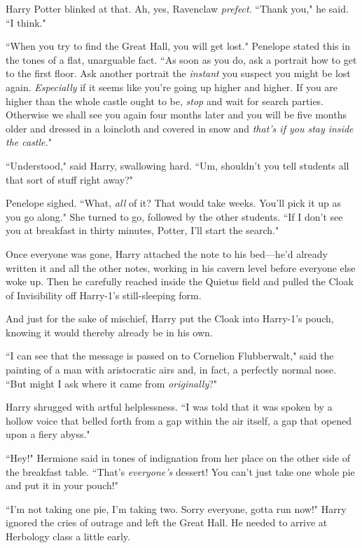 Harry Potter blinked at that. Ah, yes, Ravenclaw \emph{prefect}. ``Thank you," he said. ``I think."

``When you try to find the Great Hall, you will get lost." Penelope stated this in the tones of a flat, unarguable fact. ``As soon as you do, ask a portrait how to get to the first floor. Ask another portrait the \emph{instant} you suspect you might be lost again. \emph{Especially} if it seems like you're going up higher and higher. If you are higher than the whole castle ought to be, \emph{stop} and wait for search parties. Otherwise we shall see you again four months later and you will be five months older and dressed in a loincloth and covered in snow and \emph{that's if you stay inside the castle.}"

``Understood," said Harry, swallowing hard. ``Um, shouldn't you tell students all that sort of stuff right away?"

Penelope sighed. ``What, \emph{all} of it? That would take weeks. You'll pick it up as you go along." She turned to go, followed by the other students. ``If I don't see you at breakfast in thirty minutes, Potter, I'll start the search."

Once everyone was gone, Harry attached the note to his bed---he'd already written it and all the other notes, working in his cavern level before everyone else woke up. Then he carefully reached inside the Quietus field and pulled the Cloak of Invisibility off Harry-1's still-sleeping form.

And just for the sake of mischief, Harry put the Cloak into Harry-1's pouch, knowing it would thereby already be in his own.

\later

``I can see that the message is passed on to Cornelion Flubberwalt," said the painting of a man with aristocratic airs and, in fact, a perfectly normal nose. ``But might I ask where it came from \emph{originally}?"

Harry shrugged with artful helplessness. ``I was told that it was spoken by a hollow voice that belled forth from a gap within the air itself, a gap that opened upon a fiery abyss."

\later

``Hey!" Hermione said in tones of indignation from her place on the other side of the breakfast table. ``That's \emph{everyone's} dessert! You can't just take one whole pie and put it in your pouch!"

``I'm not taking one pie, I'm taking two. Sorry everyone, gotta run now!" Harry ignored the cries of outrage and left the Great Hall. He needed to arrive at Herbology class a little early.

